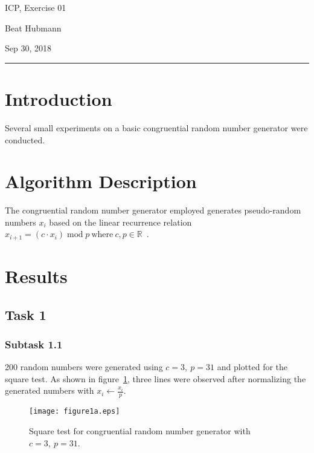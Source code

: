 \documentclass[11pt,a4paper]{article}
\begin{document}
\noindent\parbox{\linewidth}{
 \parbox{.25\linewidth}{ \large ICP, Exercise 01 }\hfill
 \parbox{.5\linewidth}{\begin{center} \large Beat Hubmann \end{center}}\hfill
 \parbox{.2\linewidth}{\begin{flushright} \large Sep 30, 2018 \end{flushright}}
}
\noindent\rule{\linewidth}{2pt}


\section{Introduction}

Several small experiments on a basic congruential random number generator were conducted.

\section{Algorithm Description}
The congruential random number generator employed generates pseudo-random numbers $x_i$ based on the linear recurrence relation $x_{i+1} = (c \cdot x_i)\; \text{mod} \; p \: \text{where} \: c, p \in \mathbb{R} $~.

\section{Results}

\subsection{Task 1}

\subsubsection{Subtask 1.1}
200 random numbers were generated using $c = 3, \: p = 31$ and plotted for the square test. As shown in figure~\ref{fig:1a}, three lines were observed after normalizing the generated numbers with $x_i \gets \frac{x_i}{p}$.


\begin{figure}[ht]
\begin{center}
\texttt{[image: figure1a.eps]} 
\end{center}
\caption{Square test for congruential random number generator with $c = 3, \: p = 31$.}
\label{fig:1a}
\end{figure}
\end{document}
